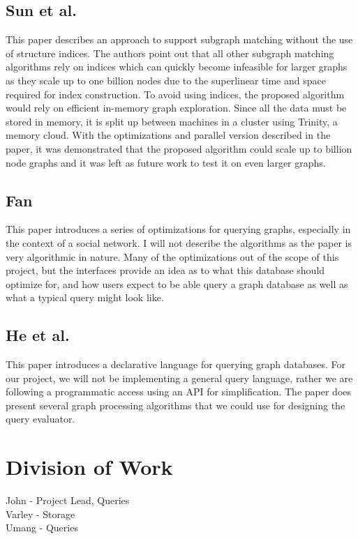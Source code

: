 \documentclass[11pt]{article}
\begin{document}
\subsection{Sun et al.}

This paper \cite{Sun} describes an approach to support subgraph matching without the use of structure indices.  The authors point out that all other subgraph matching algorithms rely on indices which can quickly become infeasible for larger graphs as they scale up to one billion nodes due to the superlinear time and space required for index construction.  To avoid using indices, the proposed algorithm would rely on efficient in-memory graph exploration.  Since all the data must be stored in memory, it is split up between machines in a cluster using Trinity, a memory cloud.  With the optimizations and parallel version described in the paper, it was demonstrated that the proposed algorithm could scale up to billion node graphs and it was left as future work to test it on even larger graphs.

\subsection{Fan}

This paper \cite{Fan} introduces a series of optimizations for querying graphs, especially in the context of a social network. I will not describe the algorithms as the paper is very algorithmic in nature. Many of the optimizations out of the scope of this project, but the interfaces provide an idea as to what this database should optimize for, and how users expect to be able query a graph database as well as what a typical query might look like.

\subsection{He et al.}

This paper\cite{He} introduces a declarative language for querying graph databases. For our project, we will not be implementing a general query language, rather we are following a programmatic access using an API for simplification. The paper does present several graph processing algorithms that we could use for designing the query evaluator.

\section{Division of Work}

John - Project Lead, Queries \\
Varley - Storage \\
Umang -  Queries \\



\end{document}
